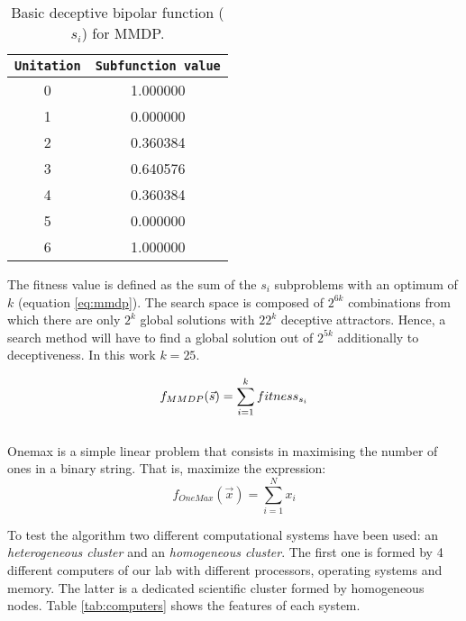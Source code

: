 \documentclass{sig-alternate}
\begin{document}
\begin{table}[h]

\centering
{%
\caption{ Basic deceptive bipolar function ($s_i$) for MMDP.}
\begin{tabular}{|c|c|}
\hline
\texttt{Unitation}&\texttt{Subfunction value}\\
\hline
0 & 1.000000 \\
\hline
1 & 0.000000 \\
\hline
2 & 0.360384 \\
\hline
3 & 0.640576\\
\hline
4 & 0.360384\\
\hline
5 & 0.000000\\
\hline
6 & 1.000000\\
\hline

\end{tabular}
}

\label{table:mmdp}
\end{table}



The fitness value is defined as the sum of the $s_i$ subproblems with an optimum of $k$ (equation \ref{eq:mmdp}).
The search space is composed of $2^{6k}$ combinations from which there
are only $2^k$ global solutions with $22^k$ deceptive
attractors. Hence, a search method will have to find a global solution
out of $2^{5k}$ additionally to deceptiveness. In this work $k=25$. 

\begin{equation}\label{eq:mmdp}
\scriptsize
f_{MMDP}(\vec s)= \sum_{i=1}^{k} fitness_{s_i}
\end{equation}\\

Onemax is a simple linear problem that consists in maximising the number of ones in a binary string. That is, maximize the expression:
\begin{equation}
f_{OneMax}(\vec{x}) = \sum_{i=1}^{N}{x_{i}}
\end{equation}


To test the algorithm two different computational systems have been used: an {\em heterogeneous cluster} and an {\em homogeneous cluster}. The first one is formed by 4 different computers of our lab with different processors, operating systems and memory. The latter is a dedicated scientific cluster formed by homogeneous nodes. Table \ref{tab:computers} shows the features of each system.
\end{document}
